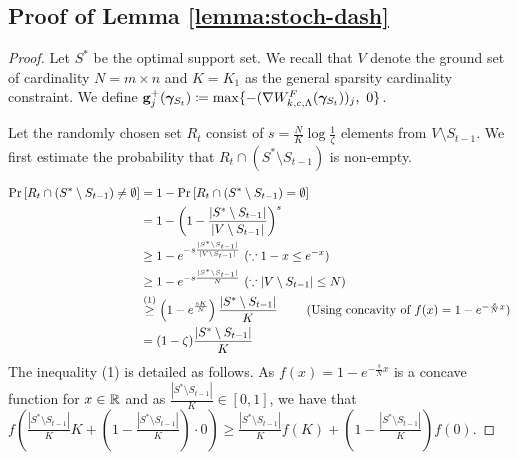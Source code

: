 \subsection[Proof of Approximation Ratio of the Proposed Algorithm for Learning Sparse OT Plans]{Proof of Lemma \ref{lemma:stoch-dash}}\label{app-lemma:stoch-dash}
\lemmastochdash*
\begin{proof}
Let $S^*$ be the optimal support set. We recall that $V$ denote the ground set of cardinality $N= m\times n$ and $K=K_1$ as the general sparsity cardinality constraint. We define $\mathbf{g}^+_j(\bm{\gamma}_{S_t})\coloneqq \max\{-(\nabla W^F_{k, c, \Lambda}(\bm{\gamma}_{S_t}))_j,\ 0\}$.

Let the randomly chosen set $R_t$ consist of $s=\frac{N}{K}\log{\frac{1}{\zeta}}$ elements from $V\setminus S_{t-1}$. We first estimate the probability that $R_t\cap (S^*\setminus S_{t-1})$ is non-empty.

\begin{align}
\Pr\left[R_t\cap (S^*\setminus {S_{t-1}})\neq\emptyset\right] & = 1-\Pr\left[R_t\cap (S^*\setminus {S_{t-1}})=\emptyset\right] \nonumber\\
& = 1-\left(1-\frac{|S^*\setminus {S_{t-1}}|}{|V\setminus {S_{t-1}}|} \right)^s \nonumber\\
& \geq 1-e^{-s\frac{|S^*\setminus {S_{t-1}}|}{|V\setminus {S_{t-1}}|}} \ (\because 1-x\leq e^{-x}) \nonumber\\
& \geq 1-e^{-s\frac{|S^*\setminus {S_{t-1}}|}{N}} \ (\because |V\setminus {S_{t-1}}|\leq N) \nonumber\\
& \stackrel{(1)}{\geq} \left(1-e^{\frac{sK}{N}}\right)\frac{|S^*\setminus {S_{t-1}}|}{K} \ \tag{Using concavity of $f(x)=1-e^{-\frac{s}{N}x}$} \nonumber\\
& = (1-\zeta)\frac{|S^*\setminus {S_{t-1}}|}{K}\label{app:stoch0}
\end{align}
The inequality (1) is detailed as follows. As $f(x) = 1-e^{-\frac{s}{N}x}$ is a concave function for $x\in \mathbb{R}$ and as $\frac{|S^*\setminus {S_{t-1}}|}{K}\in [0, 1]$, we have that $f\left(\frac{|S^*\setminus {S_{t-1}}|}{K} K+ \left(1-\frac{|S^*\setminus {S_{t-1}}|}{K}\right)\cdot 0\right)\geq \frac{|S^*\setminus {S_{t-1}}|}{K} f(K) + \left(1-\frac{|S^*\setminus {S_{t-1}}|}{K}\right)f(0)$.


\end{proof}
